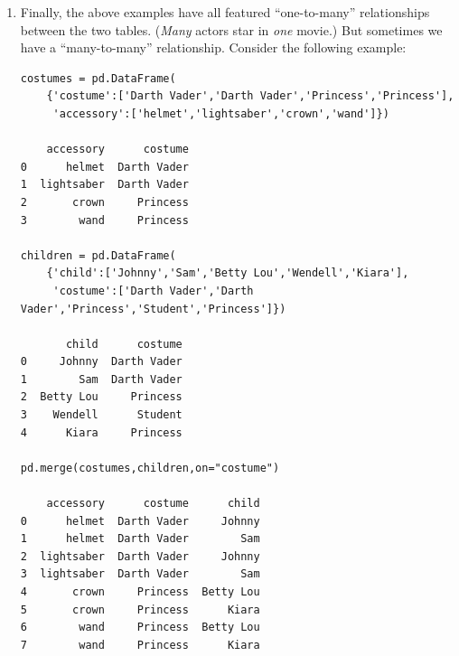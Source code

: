\documentclass[12pt]{article}
\begin{document}
\begin{enumerate}
Then the resulting DataFrame would need to have two columns named
``\texttt{year}'', with different meanings. Pandas solves this by renaming the
conflicting columns with a ``\texttt{\_x}'' or ``\texttt{\_y}'' suffix,
corresponding to the left/right tables in the join:

\footnotesize
\begin{Verbatim}[fontsize=\small,samepage=true,frame=none]
                            actors_movies:
actor      year_x   film       salary (millions)   title      director   year_y
-------------------------------------------------------------------------------
Bullock    1964     Gravity    77                  Gravity    Cuaron     2013
DiCaprio   1974     Inception  59                  Inception  Nolan      2010
\end{Verbatim}
\normalsize

(which, of course, you can rename at will via
``\texttt{actors\_movies.columns}''.)

\item Finally, the above examples have all featured ``one-to-many'' relationships
between the two tables. (\textit{Many} actors star in \textit{one} movie.) But
sometimes we have a ``many-to-many'' relationship. Consider the following
example:

\small
\begin{Verbatim}[fontsize=\small,samepage=true,frame=none]
costumes = pd.DataFrame(
    {'costume':['Darth Vader','Darth Vader','Princess','Princess'],
     'accessory':['helmet','lightsaber','crown','wand']})

    accessory      costume
0      helmet  Darth Vader
1  lightsaber  Darth Vader
2       crown     Princess
3        wand     Princess

children = pd.DataFrame(
    {'child':['Johnny','Sam','Betty Lou','Wendell','Kiara'],
     'costume':['Darth Vader','Darth Vader','Princess','Student','Princess']})

       child      costume
0     Johnny  Darth Vader
1        Sam  Darth Vader
2  Betty Lou     Princess
3    Wendell      Student
4      Kiara     Princess

pd.merge(costumes,children,on="costume")

    accessory      costume      child
0      helmet  Darth Vader     Johnny
1      helmet  Darth Vader        Sam
2  lightsaber  Darth Vader     Johnny
3  lightsaber  Darth Vader        Sam
4       crown     Princess  Betty Lou
5       crown     Princess      Kiara
6        wand     Princess  Betty Lou
7        wand     Princess      Kiara
\end{Verbatim}
\normalsize


\end{enumerate}
\end{document}

